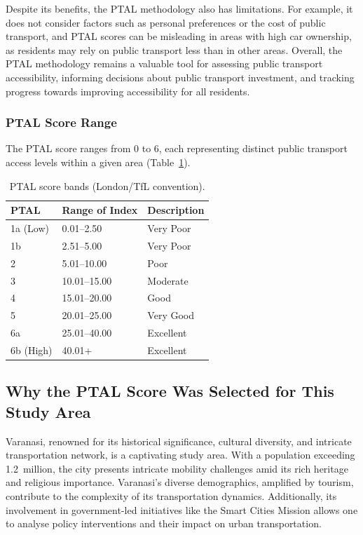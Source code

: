 \documentclass[11pt]{article}
\begin{document}
Despite its benefits, the PTAL methodology also has limitations. For example, it does not
consider factors such as personal preferences or the cost of public transport, and PTAL scores
can be misleading in areas with high car ownership, as residents may rely on public transport
less than in other areas. Overall, the PTAL methodology remains a valuable tool for assessing
public transport accessibility, informing decisions about public transport investment, and
tracking progress towards improving accessibility for all residents.

\subsubsection{PTAL Score Range}

The PTAL score ranges from 0 to 6, each representing distinct public transport access levels
within a given area (Table~\ref{tab:ptalbands}).

\begin{table}[H]
\centering
\caption{PTAL score bands (London/TfL convention).}
\label{tab:ptalbands}
\begin{tabular}{lll}
\toprule
\textbf{PTAL} & \textbf{Range of Index} & \textbf{Description} \\
\midrule
1a (Low) & 0.01--2.50 & Very Poor \\
1b       & 2.51--5.00 & Very Poor \\
2        & 5.01--10.00 & Poor \\
3        & 10.01--15.00 & Moderate \\
4        & 15.01--20.00 & Good \\
5        & 20.01--25.00 & Very Good \\
6a       & 25.01--40.00 & Excellent \\
6b (High) & 40.01+ & Excellent \\
\bottomrule
\end{tabular}
\end{table}

\subsection{Why the PTAL Score Was Selected for This Study Area}

Varanasi, renowned for its historical significance, cultural diversity, and intricate
transportation network, is a captivating study area. With a population exceeding 1.2~million,
the city presents intricate mobility challenges amid its rich heritage and religious importance.
Varanasi's diverse demographics, amplified by tourism, contribute to the complexity of its
transportation dynamics. Additionally, its involvement in government-led initiatives like the
Smart Cities Mission allows one to analyse policy interventions and their impact on urban
transportation.
\end{document}
